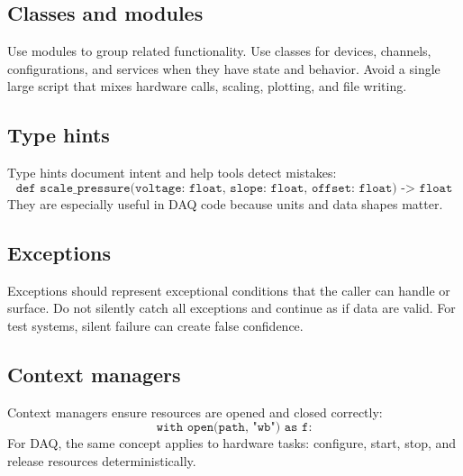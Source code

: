 \documentclass[11pt]{article}
\begin{document}
\begin{center}
\end{center}

\subsection{Classes and modules}
Use modules to group related functionality. Use classes for devices, channels,
configurations, and services when they have state and behavior. Avoid a single
large script that mixes hardware calls, scaling, plotting, and file writing.

\subsection{Type hints}
Type hints document intent and help tools detect mistakes:
\[
\texttt{def scale\_pressure(voltage: float, slope: float, offset: float) -> float}
\]
They are especially useful in DAQ code because units and data shapes matter.

\subsection{Exceptions}
Exceptions should represent exceptional conditions that the caller can handle or
surface. Do not silently catch all exceptions and continue as if data are valid.
For test systems, silent failure can create false confidence.

\subsection{Context managers}
Context managers ensure resources are opened and closed correctly:
\[
\texttt{with open(path, "wb") as f:}
\]
For DAQ, the same concept applies to hardware tasks: configure, start, stop, and
release resources deterministically.
\end{document}

